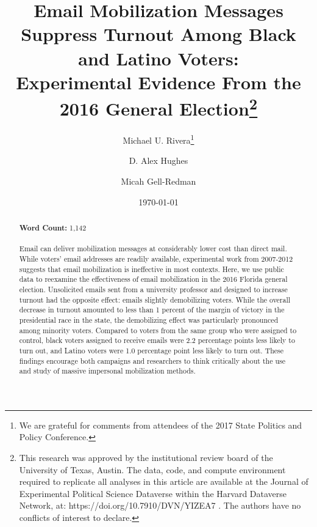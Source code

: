 \documentclass[12pt]{article}
\begin{document}
\author[1]{Michael U. Rivera\thanks{We are grateful for comments from
    attendees of the 2017 State Politics and Policy Conference.}}
\author[1]{D. Alex Hughes} \author[2,3]{Micah Gell-Redman}

\renewcommand\Authands{ and }

\title{Email Mobilization Messages Suppress Turnout Among Black and Latino Voters:\\
  Experimental Evidence From the 2016 General Election\thanks{This
    research was approved by the institutional review board of the
    University of Texas, Austin.  The data, code, and compute
    environment required to replicate all analyses in this article are
    available at the Journal of Experimental Political Science
    Dataverse within the Harvard Dataverse Network, at:
    https://doi.org/10.7910/DVN/YIZEA7 \citep{rivera2020}. The authors have no conflicts of interest to declare.}}  \date{\today}


\maketitle
\thispagestyle{empty}

\begin{abstract}
  \noindent \textbf{Word Count:}  1,142 \\ \\
  Email can deliver mobilization messages at considerably lower cost
  than direct mail. While voters’ email addresses are readily
  available, experimental work from 2007-2012 suggests that email
  mobilization is ineffective in most contexts. Here, we use public
  data to reexamine the effectiveness of email mobilization in the
  2016 Florida general election. Unsolicited emails sent from a
  university professor and designed to increase turnout had the
  opposite effect: emails slightly demobilizing voters. While the
  overall decrease in turnout amounted to less than 1 percent of the
  margin of victory in the presidential race in the state, the
  demobilizing effect was particularly pronounced among minority
  voters. Compared to voters from the same group who were assigned to
  control, black voters assigned to receive emails were 2.2 percentage
  points less likely to turn out, and Latino voters were 1.0
  percentage point less likely to turn out. These findings encourage
  both campaigns and researchers to think critically about the use and
  study of massive impersonal mobilization methods.

\end{abstract}
\end{document}
